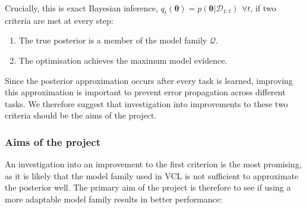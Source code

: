 \documentclass[a4paper,10pt]{article}
\let\boldtheta\theta %
\renewcommand{\theta}{\boldsymbol{\boldtheta}} %
\begin{document}
\vspace{-0.8em}
Crucially, this is exact Bayesian inference, $q_t(\theta)=p(\theta | \mathcal{D}_{1:t}) \>\, \forall t$, if two criteria are met at every step:

\begin{enumerate}
\item The true posterior is a member of the model family $\mathcal{Q}$.
\vspace{-0.2em}
\item The optimisation achieves the maximum model evidence.

\end{enumerate}

Since the posterior approximation occurs after every task is learned, improving this approximation is important to prevent error propagation across different tasks. We therefore suggest that investigation into improvements to these two criteria should be the aims of the project.

\vspace{-1em}
\subsubsection*{Aims of the project}

\vspace{-1em}
An investigation into an improvement to the first criterion is the most promising, as it is likely that the model family used in VCL is not sufficient to approximate the posterior well. The primary aim of the project is therefore to see if using a more adaptable model family results in better performance:
\end{document}
